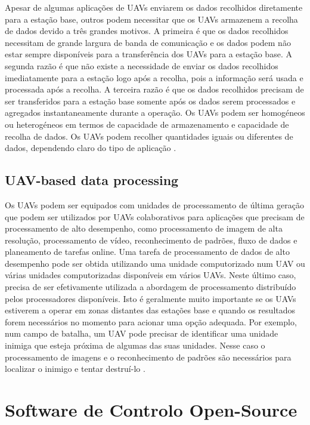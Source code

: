 Apesar de algumas aplicações de UAVs enviarem os dados recolhidos diretamente para a estação base, outros podem necessitar que os UAVs armazenem a recolha de dados devido a três grandes motivos. A primeira é que os dados recolhidos necessitam de grande largura de banda de comunicação e os dados podem não estar sempre disponíveis para a transferência dos UAVs para a estação base. A segunda razão é que não existe a necessidade de enviar os dados recolhidos imediatamente para a estação logo após a recolha, pois a informação será usada e processada após a recolha. A terceira razão é que os dados recolhidos precisam de ser transferidos para a estação base somente após os dados serem processados e agregados instantaneamente durante a operação. Os UAVs podem ser homogéneos ou heterogéneos em termos de capacidade de armazenamento e capacidade de recolha de dados. Os UAVs podem recolher quantidades iguais ou diferentes de dados, dependendo claro do tipo de aplicação \cite{ImadJawhar2017}.

\subsection{UAV-based data processing}

Os UAVs podem ser equipados com unidades de processamento de última geração que podem ser utilizados por UAVs colaborativos para aplicações que precisam de processamento de alto desempenho, como processamento de imagem de alta resolução, processamento de vídeo, reconhecimento de padrões, fluxo de dados e planeamento de tarefas online. Uma tarefa de processamento de dados de alto desempenho pode ser obtida utilizando uma unidade computorizado num UAV ou várias unidades computorizadas disponíveis em vários UAVs. Neste último caso, precisa de ser efetivamente utilizada a abordagem de processamento distribuído pelos processadores disponíveis. Isto é geralmente muito importante se os UAVs estiverem a operar em zonas distantes das estações base e quando os resultados forem necessários no momento para acionar uma opção adequada. Por exemplo, num campo de batalha, um UAV pode precisar de identificar uma unidade inimiga que esteja próxima de algumas das suas unidades. Nesse caso o processamento de imagens e o reconhecimento de padrões são necessários para localizar o inimigo e tentar destruí-lo \cite{ImadJawhar2017}.

\section{Software de Controlo Open-Source}\label{chap:cs_opensource}

